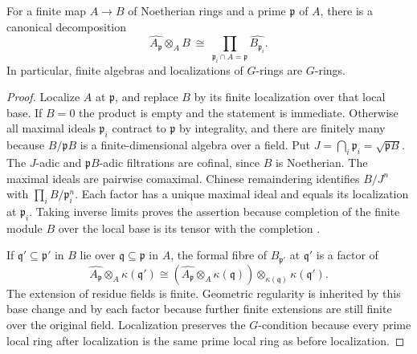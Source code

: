 \begin{lemma}\label{res:X06}
For a finite map \(A\to B\) of Noetherian rings and a prime \(\mathfrak p\) of \(A\), there is a canonical decomposition
\[
 \widehat{A_{\mathfrak p}}\otimes_A B
 \ \cong\ \prod_{\mathfrak p_i\cap A=\mathfrak p}\widehat{B_{\mathfrak p_i}}.
\]
In particular, finite algebras and localizations of \(G\)-rings are \(G\)-rings.
\end{lemma}
\begin{proof}
Localize \(A\) at \(\mathfrak p\), and replace \(B\) by its finite localization over that local base. If \(B=0\) the product is empty and the statement is immediate. Otherwise all maximal ideals \(\mathfrak p_i\) contract to \(\mathfrak p\) by integrality, and there are finitely many because \(B/\mathfrak p B\) is a finite-dimensional algebra over a field. Put \(J=\bigcap_i\mathfrak p_i=\sqrt{\mathfrak p B}\). The \(J\)-adic and \(\mathfrak p B\)-adic filtrations are cofinal, since \(B\) is Noetherian. The maximal ideals are pairwise comaximal. Chinese remaindering identifies \(B/J^n\) with \(\prod_i B/\mathfrak p_i^n\). Each factor has a unique maximal ideal and equals its localization at \(\mathfrak p_i\). Taking inverse limits proves the assertion because completion of the finite module \(B\) over the local base is its tensor with the completion \cite[ALG-05-C04-R03]{p103}.

If \(\mathfrak q'\subseteq\mathfrak p'\) in \(B\) lie over \(\mathfrak q\subseteq\mathfrak p\) in \(A\), the formal fibre of \(B_{\mathfrak p'}\) at \(\mathfrak q'\) is a factor of
\[
 \widehat{A_{\mathfrak p}}\otimes_A\kappa(\mathfrak q')
 \cong (\widehat{A_{\mathfrak p}}\otimes_A\kappa(\mathfrak q))
                         \otimes_{\kappa(\mathfrak q)}\kappa(\mathfrak q').
\]
The extension of residue fields is finite. Geometric regularity is inherited by this base change and by each factor because further finite extensions are still finite over the original field. Localization preserves the \(G\)-condition because every prime local ring after localization is the same prime local ring as before localization.
\end{proof}

